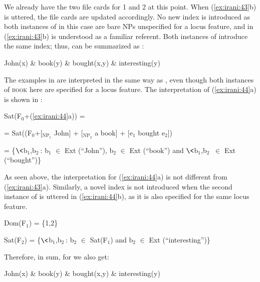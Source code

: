 \documentclass[output=paper,
modfonts
]{langscibook}
\begin{document}
We already have the two file cards for 1 and 2 at this point. When (\ref{ex:irani:43}b) is uttered, the file cards are updated accordingly. No new index is introduced as both instances of  in this case are bare NPs unspecified for a locus feature, and  in (\ref{ex:irani:43}b) is understood as a familiar referent. Both instances of  introduce the same index; thus,  can be summarized as : 

\begin{exe}
\ex\label{ex:irani:50} John(x) \& book(y) \& bought(x,y) \& interesting(y)
\end{exe}


The examples in  are interpreted in the same way as , even though both instances of \textsc{book} here are specified for a locus feature. The interpretation of (\ref{ex:irani:44}a) is shown in :

\begin{exe}
  
\ex\label{ex:irani:51} Sat(F$_0$+(\ref{ex:irani:44}a)) = \par 
= Sat((F$_0$+[$_{\text{NP}_{1}}$ John] + [$_{\text{NP}_{2}}$ a book] + [e$_1$ bought e$_2$])\par 
= \{$\<$b$_1$,b$_2\>$: b$_1$ \(\in\) Ext (``John''), b$_2$ \(\in\) Ext (``book'') and $\<$b$_1$,b$_2\>$ \(\in\) Ext (``bought'')\} \par 

\end{exe}


As seen above, the interpretation for (\ref{ex:irani:44}a) is not different from (\ref{ex:irani:43}a). Similarly, a novel index is not introduced when the second instance of  is uttered in (\ref{ex:irani:44}b), as it is also specified for the same locus feature.  

\begin{exe}

\ex Dom(F$_1$) = \{1,2\} \par 
Sat(F$_2$) = \{$\<$b$_1$,b$_2\>$: b$_2$ \(\in\) Sat(F$_1$) and b$_2$ \(\in\) Ext (``interesting'')\} \par 

\end{exe}

Therefore, in sum, for  we also get: 

\begin{exe}

\ex John(x) \& book(y) \& bought(x,y) \& interesting(y)

\end{exe}
\end{document}
